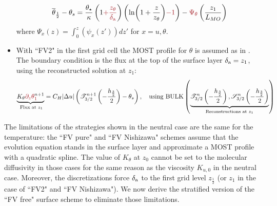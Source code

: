 \begin{itemize}
\begin{equation}
\begin{aligned}
			\overline{\theta}_{\frac{1}{2}} - \theta_s=
			\frac{\theta_\star}{\kappa}
			\left(1\emphase{+\frac{z_\theta}
					{\delta_{\rm a}}}\right)
		\left(\ln(1+\frac{z}{z_\theta})\emphase{-1}\right)
		- \emphase{\Psi_\theta}\left(\frac{z_1}{L_{MO}}\right)
		\end{aligned}
		\end{equation}
		where $\Psi_x(z) = \int_0^z (\psi_x(z'))dz'$
		for $x=u,\theta$.
	\item With ``FV2" in the first grid cell
		the MOST profile for $\theta$ is assumed as in
		\cite{nishizawa_surface_2018}.
		The boundary condition is the flux at the top of the
		surface layer $\delta_{\rm a}=z_1$,
		using the reconstructed solution at $z_1$:
		\begin{equation}
			\underbrace{K_\theta
			\emphase{\partial_z \theta}^{n+1}_\emphase{1}}_{\text{
				Flux at
			} z_1} =
			C_H|\Delta u|\left(
			{\cal T}_{3/2}^{n+1}
			\left(-\frac{h_\frac{3}{2}}{2}\right)
			- \theta_s\right),
			~~~ \text{using } {\rm BULK}
			\left(\underbrace{{\cal T}_{3/2}^{n}
			\left(-\frac{h_\frac{3}{2}}{2}\right),
			{\cal S}_{3/2}^{n}
			\left(-\frac{h_\frac{3}{2}}{2}\right)}_{
			\text{Reconstructions at } z_1 }\right)
		\end{equation}
\end{itemize}
The limitations of the strategies shown in the neutral case are the
same for the temperature: the ``FV pure" and ``FV Nishizawa" schemes
assume that the evolution equation stands
in the surface layer and approximate a MOST profile with
a quadratic spline.
The value of $K_\theta$ at $z_0$ cannot be set to the molecular
diffusivity in those cases for the same reason as the
viscosity $K_{u,0}$ in the neutral case.
%
Moreover, the discretizations force $\delta_{\rm a}$ to the first
grid level $z_{\frac{1}{2}}$ (or $z_1$ in the case of ``FV2" and
``FV Nishizawa").
We now derive the stratified version of the ``FV free" surface scheme
to eliminate those limitations.
